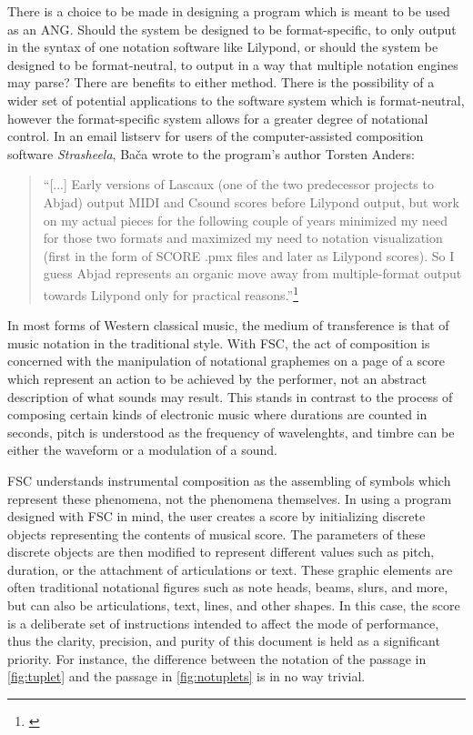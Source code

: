 There is a choice to be made in designing a program which is meant to be used as an \ac{ANG}. Should the system be designed to be format-specific, to only output in the syntax of one notation software like Lilypond, or should the system be designed to be format-neutral, to output in a way that multiple notation engines may parse? There are benefits to either method. There is the possibility of a wider set of potential applications to the software system which is format-neutral, however the format-specific system allows for a greater degree of notational control. In an email listserv for users of the computer-assisted composition software \textit{Strasheela}, Ba\v{c}a wrote to the program's author Torsten Anders:

\begin{quote}
\singlespacing
``[...] Early versions of Lascaux (one of the two predecessor projects to Abjad) output \ac{MIDI} and Csound scores before Lilypond output, but work on my actual pieces for the following couple of years minimized my need for those two formats and maximized my need to notation visualization (first in the form of SCORE .pmx files and later as Lilypond scores). So I guess Abjad represents an organic move away from multiple-format output towards Lilypond only for practical reasons.''\footnote{\citet{strasheela}}
\end{quote}

In most forms of Western classical music, the medium of transference is that of music notation in the traditional style. With \ac{FSC}, the act of composition is concerned with the manipulation of notational graphemes on a page of a score which represent an action to be achieved by the performer, not an abstract description of what sounds may result. This stands in contrast to the process of composing certain kinds of electronic music where durations are counted in seconds, pitch is understood as the frequency of wavelenghts, and timbre can be either the waveform or a modulation of a sound.

\ac{FSC} understands instrumental composition as the assembling of symbols which represent these phenomena, not the phenomena themselves. In using a program designed with \ac{FSC} in mind, the user creates a score by initializing discrete objects representing the contents of musical score. The parameters of these discrete objects are then modified to represent different values such as pitch, duration, or the attachment of articulations or text. These graphic elements are often traditional notational figures such as note heads, beams, slurs, and more, but can also be articulations, text, lines, and other shapes. In this case, the score is a deliberate set of instructions intended to affect the mode of performance, thus the clarity, precision, and purity of this document is held as a significant priority. For instance, the difference between the notation of the passage in \autoref{fig:tuplet} and the passage in \autoref{fig:notuplets} is in no way trivial.

